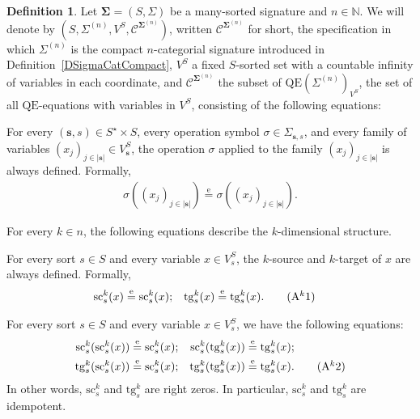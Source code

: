 \documentclass{amsart}
\theoremstyle{plain}
\theoremstyle{definition}
\newtheorem{definition}[theorem]{Definition}
\begin{document}
\begin{definition}\label{DVarCompact}
Let $\mathbf{\Sigma}=(S,\Sigma)$ be a many-sorted signature and $n\in\mathbb{N}$. We will denote by $(S,\Sigma^{(n)},V^{S},\mathcal{C}^{\mathbf{\Sigma}^{(n)}})$, written $\boldsymbol{\mathcal{C}}^{\mathbf{\Sigma}^{(n)}}$ for short, the specification in which $\Sigma^{(n)}$ is the compact $n$-categorial signature introduced in Definition~\ref{DSigmaCatCompact}, $V^{S}$ a fixed $S$-sorted set with a countable infinity of variables in each coordinate, and $\mathcal{C}^{\mathbf{\Sigma}^{(n)}}$ the subset of $\mathrm{QE}(\Sigma^{(n)})_{V^{S}}$, the set of all $\mathrm{QE}$-equations with variables in $V^{S}$, consisting of the following equations:

For every $(\mathbf{s},s)\in S^{\star}\times S$, every operation symbol $\sigma\in \Sigma_{\mathbf{s},s}$, and every family of variables $(x_{j})_{j\in \lvert\mathbf{s}\rvert}\in V^{S}_{\mathbf{s}}$, the operation $\sigma$ applied to the family $(x_{j})_{j\in \lvert\mathbf{s}\rvert}$ is always defined. Formally,
\allowdisplaybreaks
\begin{align*}
\sigma((x_{j})_{j\in \lvert\mathbf{s}\rvert})\overset{\mathrm{e}}{=}\sigma((x_{j})_{j\in \lvert\mathbf{s}\rvert}).\label{DVarCompactA0}\tag{A0}
\end{align*}

For every $k\in n$, the following equations describe the $k$-dimensional structure.

For every sort $s\in S$ and every variable $x\in V^{S}_{s}$, the $k$-source and $k$-target of $x$ are always defined. Formally,
\allowdisplaybreaks
\begin{align*}
\mathrm{sc}^{k}_{s}(x)&\overset{\mathrm{e}}{=}\mathrm{sc}^{k}_{s}(x);
&
\mathrm{tg}^{k}_{s}(x)&\overset{\mathrm{e}}{=}\mathrm{tg}^{k}_{s}(x).\label{DVarCompactAk1}\tag{A$^{k}$1}
\end{align*}

For every sort $s\in S$ and every variable $x\in V^{S}_{s}$, we have the following equations:
\allowdisplaybreaks
\begin{align*}
\mathrm{sc}^{k}_{s}(\mathrm{sc}^{k}_{s}(x))&\overset{\mathrm{e}}{=}\mathrm{sc}^{k}_{s}(x);
&
\mathrm{sc}^{k}_{s}(\mathrm{tg}^{k}_{s}(x))&\overset{\mathrm{e}}{=}\mathrm{tg}^{k}_{s}(x);\\
\mathrm{tg}^{k}_{s}(\mathrm{sc}^{k}_{s}(x))&\overset{\mathrm{e}}{=}\mathrm{sc}^{k}_{s}(x);
&
\mathrm{tg}^{k}_{s}(\mathrm{tg}^{k}_{s}(x))&\overset{\mathrm{e}}{=}\mathrm{tg}^{k}_{s}(x).\label{DVarCompactAk2}\tag{A$^{k}$2}
\end{align*}
In other words, $\mathrm{sc}^{k}_{s}$ and $\mathrm{tg}^{k}_{s}$ are right zeros. In particular, $\mathrm{sc}^{k}_{s}$ and $\mathrm{tg}^{k}_{s}$ are idempotent.


\end{definition}
\end{document}

